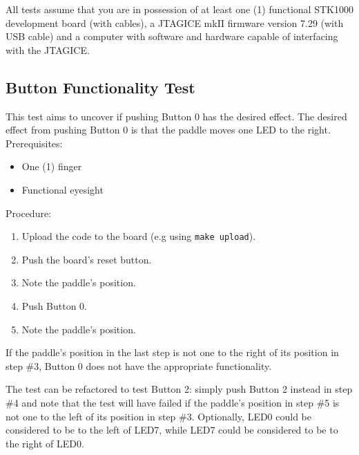 All tests assume that you are in possession of at least one (1) functional STK1000 development board (with cables), a JTAGICE mkII firmware version 7.29 (with USB cable) and a computer with software and hardware capable of interfacing with the JTAGICE.
\subsection{Button Functionality Test}
This test aims to uncover if pushing Button 0 has the desired effect. The desired effect from pushing Button 0 is that the paddle moves one LED to the right.
\\ Prerequisites:
\begin{itemize}
	\item One (1) finger
	\item Functional eyesight
\end{itemize}
Procedure:
\begin{enumerate}
	\item Upload the code to the board (e.g using \texttt{make upload}).
	\item Push the board's reset button.
	\item Note the paddle's position.
	\item Push Button 0.
	\item Note the paddle's position.
\end{enumerate}
If the paddle's position in the last step is not one to the right of its position in step \#3, Button 0 does not have the appropriate functionality.

The test can be refactored to test Button 2: simply push Button 2 instead in step \#4 and note that the test will have failed if the paddle's position in step \#5 is not one to the left of its position in step \#3.
Optionally, LED0 could be considered to be to the left of LED7, while LED7 could be considered to be to the right of LED0.

